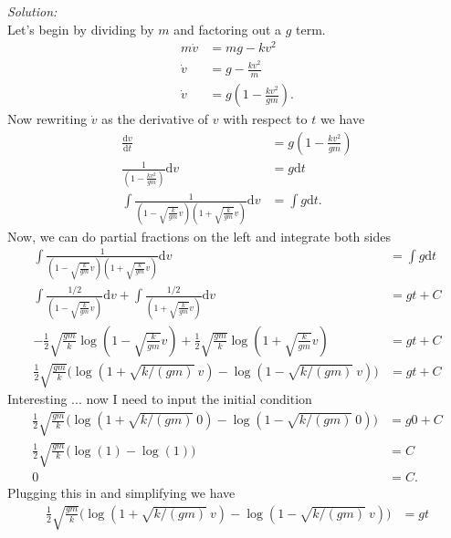 \documentclass[10pt]{amsart}
\newcommand{\D}{\mathrm{d}}
\theoremstyle{nonumberplain}
\begin{document}
\begin{enumerate}[label={\bf {\arabic*}:}]
\begin{enumerate}
\noindent
\textit{Solution:} \\
Let's begin by dividing by $m$ and factoring out a $g$ term.
\begin{align*}
m \dot v &= mg - kv^2 \\
\dot v &= g - \frac{kv^2}{m} \\
\dot v &= g\left( 1 - \frac{kv^2}{gm}\right).
\end{align*}
Now rewriting $\dot v$ as the derivative of $v$ with respect to $t$ we have
\begin{align*}
\frac{\D v}{\D t} &= g\left( 1 - \frac{kv^2}{gm}\right) \\
\frac{1}{\left( 1 - \frac{kv^2}{gm}\right)}\D v &= g \D t \\
\int \frac{1}{\left( 1 - \sqrt{\frac{k}{gm}}v\right)\left( 1 + \sqrt{\frac{k}{gm}}v\right)}\D v &= \int g \D t.
\end{align*}
Now, we can do partial fractions on the left and integrate both sides
\begin{align*}
\int \frac{1}{\left( 1 - \sqrt{\frac{k}{gm}}v\right)\left( 1 + \sqrt{\frac{k}{gm}}v\right)}\D v &= \int g \D t \\
\int \frac{1/2}{\left( 1 - \sqrt{\frac{k}{gm}}v\right)}\D v
	+ \int \frac{1/2}{\left( 1 + \sqrt{\frac{k}{gm}}v\right)}\D v
	 &= g t + C \\
- \frac 1 2 \sqrt{\frac {gm}{k}}\log\left( 1 - \sqrt{\frac{k}{gm}}v\right)
	+ \frac 1 2 \sqrt{\frac {gm}{k}}\log\left( 1 + \sqrt{\frac{k}{gm}}v\right)
	 &= g t + C \\
\frac 1 2 \sqrt{\frac {gm}{k}}\Bigg( \log \left( 1 + \sqrt{k/(gm)} \: v\right) 
	- \log \left( 1 - \sqrt{k/(gm)} \: v\right) \Bigg)
	 &= g t + C
\end{align*}
Interesting ... now I need to input the initial condition \\
\begin{align*}
\frac 1 2 \sqrt{\frac {gm}{k}}\Bigg( \log \left( 1 + \sqrt{k/(gm)} \: 0\right) 
	- \log \left( 1 - \sqrt{k/(gm)} \: 0\right) \Bigg)
	 &= g 0 + C \\
\frac 1 2 \sqrt{\frac {gm}{k}}\Bigg( \log \left( 1 \right) 
	- \log \left( 1 \right) \Bigg) &= C \\
	0 &= C.
\end{align*}
Plugging this in and simplifying we have
\begin{align*}
\frac 1 2 \sqrt{\frac {gm}{k}}\Bigg( \log \left( 1 + \sqrt{k/(gm)} \: v\right) 
	- \log \left( 1 - \sqrt{k/(gm)} \: v\right) \Bigg)
	 &= g t \\

\end{align*}
\end{enumerate}
\end{enumerate}
\end{document}
